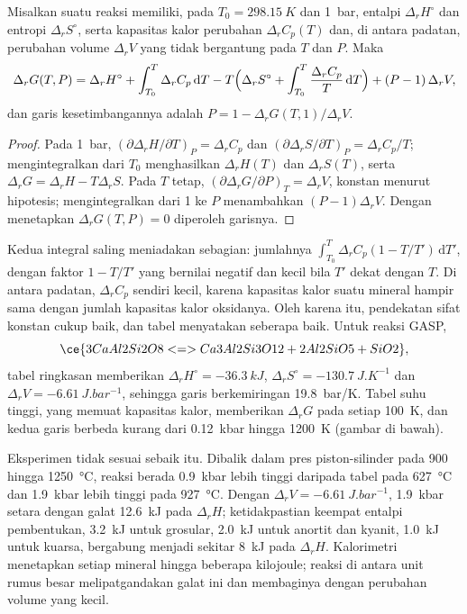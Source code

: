 \begin{theorem}\label{thm:b3:petrological-thermodynamics:dg}
Misalkan suatu reaksi memiliki, pada $T_0 = \qty{298.15}{K}$ dan \qty{1}{bar},
entalpi $\Delta_rH^\circ$ dan entropi $\Delta_rS^\circ$, serta kapasitas kalor
perubahan $\Delta_rC_p(T)$ dan, di antara padatan, perubahan volume $\Delta_rV$
yang tidak bergantung pada $T$ dan $P$. Maka
\[
  \Delta_rG(T, P) = \Delta_rH^\circ + \int_{T_0}^{T}\Delta_rC_p\,\mathrm dT
  - T\Bigl(\Delta_rS^\circ + \int_{T_0}^{T}\frac{\Delta_rC_p}{T}\,\mathrm dT\Bigr)
  + (P - 1)\,\Delta_rV ,
\]
dan garis kesetimbangannya adalah $P = 1 - \Delta_rG(T, 1)/\Delta_rV$.
\end{theorem}

\begin{proof}
Pada \qty{1}{bar}, $(\partial\Delta_rH/\partial T)_P = \Delta_rC_p$ dan
$(\partial\Delta_rS/\partial T)_P = \Delta_rC_p/T$; mengintegralkan dari $T_0$
menghasilkan $\Delta_rH(T)$ dan $\Delta_rS(T)$, serta $\Delta_rG = \Delta_rH -
T\Delta_rS$. Pada $T$ tetap, $(\partial\Delta_rG/\partial P)_T = \Delta_rV$,
konstan menurut hipotesis; mengintegralkan dari 1 ke $P$ menambahkan $(P - 1)\Delta_rV$.
Dengan menetapkan $\Delta_rG(T, P) = 0$ diperoleh garisnya.
\end{proof}

Kedua integral saling meniadakan sebagian: jumlahnya $\int_{T_0}^T\Delta_rC_p(1 -
T/T')\,\mathrm dT'$, dengan faktor $1 - T/T'$ yang bernilai negatif dan kecil
bila $T'$ dekat dengan $T$. Di antara padatan, $\Delta_rC_p$ sendiri kecil,
karena kapasitas kalor suatu mineral hampir sama dengan jumlah kapasitas kalor
oksidanya. Oleh karena itu, pendekatan sifat konstan cukup baik, dan
tabel menyatakan seberapa baik. Untuk reaksi GASP,
\[
  \ce{3 CaAl2Si2O8 <=> Ca3Al2Si3O12 + 2 Al2SiO5 + SiO2},
\]
tabel ringkasan memberikan $\Delta_rH^\circ = \qty{-36.3}{kJ}$,
$\Delta_rS^\circ = \qty{-130.7}{J.K^{-1}}$ dan $\Delta_rV =
\qty{-6.61}{J.bar^{-1}}$, sehingga garis berkemiringan \qty{19.8}{bar/K}. Tabel
suhu tinggi, yang memuat kapasitas kalor, memberikan
$\Delta_rG$ pada setiap \qty{100}{K}, dan kedua garis berbeda kurang dari
\qty{0.12}{kbar} hingga \qty{1200}{K} (gambar di bawah).

Eksperimen tidak sesuai sebaik itu. Dibalik dalam pres piston-silinder pada
900 hingga \qty{1250}{\celsius}, reaksi berada \qty{0.9}{kbar} lebih tinggi daripada
tabel pada \qty{627}{\celsius} dan \qty{1.9}{kbar} lebih tinggi pada
\qty{927}{\celsius}. Dengan $\Delta_rV = \qty{-6.61}{J.bar^{-1}}$,
\qty{1.9}{kbar} setara dengan galat \qty{12.6}{kJ} pada $\Delta_rH$; ketidakpastian
keempat entalpi pembentukan, \qty{3.2}{kJ} untuk
grosular, \qty{2.0}{kJ} untuk anortit dan kyanit, \qty{1.0}{kJ} untuk
kuarsa, bergabung menjadi sekitar \qty{8}{kJ} pada $\Delta_rH$. Kalorimetri menetapkan setiap
mineral hingga beberapa kilojoule; reaksi di antara unit rumus besar melipatgandakan
galat ini dan membaginya dengan perubahan volume yang kecil.

